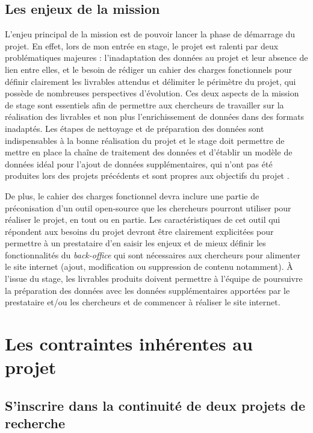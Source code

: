 \subsection{Les enjeux de la mission}
L'enjeu principal de la mission est de pouvoir lancer la phase de démarrage du projet. En effet, lors de mon entrée en stage, le projet est ralenti par deux problématiques majeures : l'inadaptation des données au projet et leur absence de lien entre elles, et le besoin de rédiger un cahier des charges fonctionnels pour définir clairement les livrables attendus et délimiter le périmètre du projet, qui possède de nombreuses perspectives d'évolution. Ces deux aspects de la mission de stage sont essentiels afin de permettre aux chercheurs de travailler sur la réalisation des livrables et non plus l'enrichissement de données dans des formats inadaptés. Les étapes de nettoyage et de préparation des données sont indispensables à la bonne réalisation du projet et le stage doit permettre de mettre en place la chaîne de traitement des données et d'établir un modèle de données idéal pour l'ajout de données supplémentaires, qui n'ont pas été produites lors des projets précédents et sont propres aux objectifs du projet \COREL.

De plus, le cahier des charges fonctionnel devra inclure une partie de préconisation d'un outil open-source que les chercheurs pourront utiliser pour réaliser le projet, en tout ou en partie. Les caractéristiques de cet outil qui répondent aux besoins du projet devront être clairement explicitées pour permettre à un prestataire d'en saisir les enjeux et de mieux définir les fonctionnalités du \textit{back-office} qui sont nécessaires aux chercheurs pour alimenter le site internet (ajout, modification ou suppression de contenu notamment). À l'issue du stage, les livrables produits doivent permettre à l'équipe de poursuivre la préparation des données avec les données supplémentaires apportées par le prestataire et/ou les chercheurs et de commencer à réaliser le site internet. 

\section{Les contraintes inhérentes au projet}
    \subsection{S’inscrire dans la continuité de deux projets de recherche}

